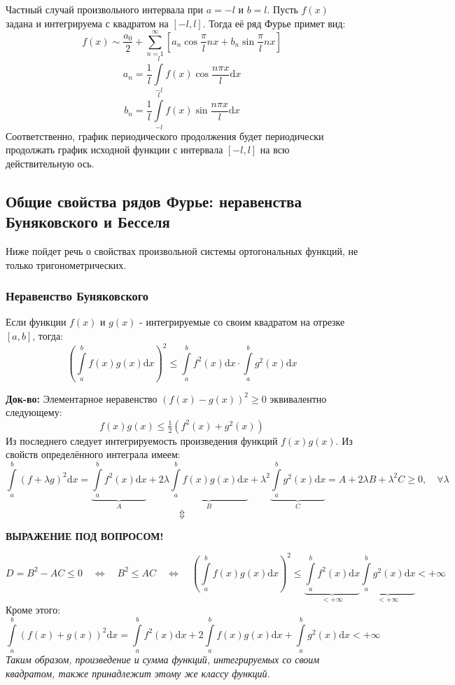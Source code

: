 \documentclass[12pt, a4paper]{article}
\newcommand{\di}{\mathrm{d}}
\begin{document}
Частный случай произвольного интервала при $a = -l$ и $b = l$. Пусть $f(x)$ задана и интегрируема с квадратом на $[-l, l]$. Тогда её ряд Фурье примет вид:
\[f(x) \sim \frac{a_0}{2} + \sum_{n=1}^{\infty} \left[ a_n \cos \frac{\pi}{l} nx + b_n \sin \frac{\pi}{l} nx \right] \]
\[a_n = \frac{1}{l} \int \limits_{-l}^l f(x) \cos \frac{n\pi x}{l} \di x \]
\[b_n = \frac{1}{l} \int \limits_{-l}^l f(x) \sin \frac{n\pi x}{l} \di x \]
Соответственно, график периодического продолжения будет периодически продолжать график исходной функции с интервала $[-l, l]$ на всю действительную ось.

\subsection{Общие свойства рядов Фурье: неравенства Буняковского и Бесселя}

Ниже пойдет речь о свойствах произвольной системы ортогональных функций, не только тригонометрических.

\subsubsection{Неравенство Буняковского}

Если функции $f(x)$ и $g(x)$ - интегрируемые со своим квадратом на отрезке $[a, b]$, тогда:
\[\left( \int \limits_a^b f(x) g(x) \di x \right)^2 \leq \int \limits_a^b f^2(x) \di x \cdot \int \limits_a^b g^2(x) \di x \]

\textbf{Док-во:} Элементарное неравенство $(f(x) - g(x))^2 \geq 0$ эквивалентно следующему:
\[f(x) g(x) \leq \tfrac{1}{2} (f^2(x) + g^2(x)) \]
Из последнего следует интегрируемость произведения функций $f(x) g(x)$. Из свойств определённого интеграла имеем:
\[\int \limits_a^b (f + \lambda g)^2 \di x = \underbrace{\int \limits_a^b f^2(x) \di x}_A + 2\lambda \underbrace{\int \limits_a^b f(x) g(x) \di x}_B + \lambda^2 \underbrace{\int \limits_a^b g^2(x) \di x}_C = A + 2\lambda B + \lambda^2 C \geq 0, \quad \forall \lambda \]
\[\Updownarrow \]
\begin{center}
\textbf{ВЫРАЖЕНИЕ ПОД ВОПРОСОМ!}
\end{center}
\[D = B^2 - AC \leq 0 \quad \Leftrightarrow \quad B^2 \leq AC \quad \Leftrightarrow \quad \left( \int \limits_a^b f(x) g(x) \di x \right)^2 \leq \underbrace{\int \limits_a^b f^2(x) \di x}_{< +\infty} \underbrace{\int \limits_a^b g^2(x) \di x}_{< +\infty} < +\infty \]
Кроме этого:
\[\int \limits_a^b (f(x)+g(x))^2 \di x = \int \limits_a^b f^2(x) \di x + 2\int \limits_a^b f(x) g(x) \di x + \int \limits_a^b g^2(x) \di x < +\infty \]
\textit{Таким образом, произведение и сумма функций, интегрируемых со своим квадратом, также принадлежит этому же классу функций.}
\end{document}
